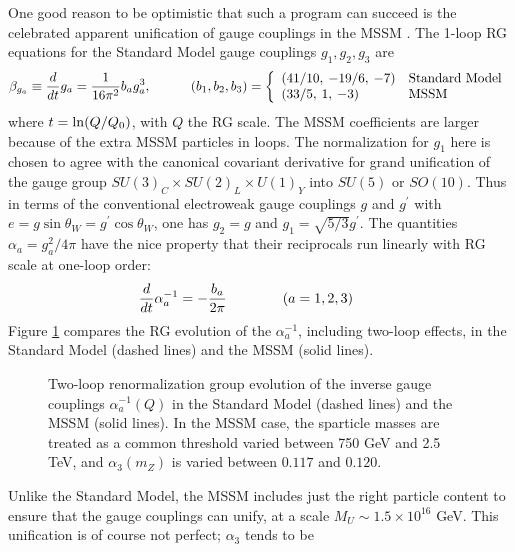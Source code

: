 \documentclass[12pt]{article}
\def\beq{\begin{eqnarray}}
\def\eeq{\end{eqnarray}}
\begin{document}
One good reason to be optimistic that such a program can succeed is the
celebrated apparent unification of gauge couplings in the MSSM
\cite{gaugeunification}. The 1-loop RG equations for the Standard Model
gauge couplings $g_1, g_2, g_3$ are 
\beq
\beta_{g_a} \equiv {d\over dt} g_a =  {1\over 16\pi^2} b_a g_a^3, 
\qquad\quad 
(b_1, b_2, b_3) = 
\left \{ \begin{array}{ll}
(41/10,\> -19/6,\> -7) & \mbox{Standard Model}\\
(33/5,\> 1,\> -3) & \mbox{MSSM}
\end{array}
\right.
\label{mssmg}
\eeq
where $t= {\rm ln} (Q/Q_0)$, with $Q$ the RG scale. The MSSM 
coefficients are larger because of the extra MSSM
particles in loops. The normalization for $g_1$ here is chosen to agree
with the canonical covariant derivative for grand unification of the gauge
group $SU(3)_C \times SU(2)_L\times U(1)_Y$ into $SU(5)$ or $SO(10)$. Thus
in terms of the conventional electroweak gauge couplings $g$ and
$g^\prime$ with $e = g\sin\theta_W = g^\prime \cos\theta_W$, one has
$g_2=g$ and $g_1 = \sqrt{5/3} g^\prime$. The quantities $\alpha_a =
g_a^2/4\pi$ have the nice property that their reciprocals run linearly
with RG scale at one-loop order:
\beq
{d\over dt} \alpha_a^{-1} = -{b_a\over 2\pi} \qquad\qquad (a=1,2,3)
\qquad
\label{mssmgrecip}
\eeq  
Figure \ref{fig:gaugeunification} compares the RG evolution of the 
$\alpha_a^{-1}$, including two-loop effects, in the Standard Model (dashed 
lines) and the MSSM (solid lines). 
\begin{figure}
\begin{minipage}[]{0.355\linewidth} 
\caption{Two-loop renormalization group evolution of the inverse gauge 
couplings 
$\alpha_a^{-1}(Q)$ in
the Standard Model (dashed lines) and the MSSM (solid lines). In the MSSM
case, the sparticle masses are treated as a common threshold varied 
between 750 GeV and 2.5 TeV, and $\alpha_3(m_Z)$ is varied between 
$0.117$ and $0.120$. 
\label{fig:gaugeunification}}
\end{minipage}
\begin{minipage}[]{0.64\linewidth} 
\hspace{.06\linewidth}
{} 
\end{minipage}
\end{figure}%
Unlike the Standard Model, the MSSM 
includes just the right particle content to ensure that the gauge 
couplings can unify, at a scale $M_U \sim 1.5\times 10^{16}$ GeV. 
This unification is of course not perfect; $\alpha_3$ tends to be 
\end{document}
